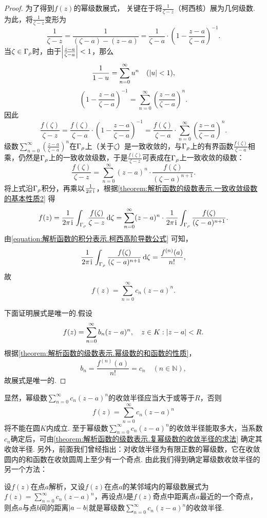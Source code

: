 \begin{theorem}
\begin{proof}
为了得到\(f(z)\)的幂级数展式，
关键在于将\(\frac{1}{\zeta-z}\)（柯西核）展为几何级数.
为此，将\(\frac{1}{\zeta-z}\)变形为\[
\frac{1}{\zeta-z}
= \frac{1}{(\zeta-a)-(z-a)}
= \frac{1}{\zeta-a} \cdot \left(1 - \frac{z-a}{\zeta-a}\right)^{-1}.
\]当\(\zeta \in \Gamma_{\rho}\)时，由于\(\abs{\frac{z-a}{\zeta-a}}<1\)，那么\[
\frac{1}{1-u} = \sum_{n=0}^\infty u^n
\quad(\abs{u}<1),
\]\[
\left(1 - \frac{z-a}{\zeta-a}\right)^{-1}
= \sum_{n=0}^\infty \left(\frac{z-a}{\zeta-a}\right)^n.
\]因此\[
\frac{f(\zeta)}{\zeta-z}
= \frac{f(\zeta)}{\zeta-a} \cdot \left(1 - \frac{z-a}{\zeta-a}\right)^{-1}
= \frac{f(\zeta)}{\zeta-a} \cdot \sum_{n=0}^\infty \left(\frac{z-a}{\zeta-a}\right)^n.
\]级数\(\sum_{n=0}^\infty \left(\frac{z-a}{\zeta-a}\right)^n\)在\(\Gamma_{\rho}\)上（关于\(\zeta\)）是一致收敛的，与\(\Gamma_{\rho}\)上的有界函数\(\frac{f(\zeta)}{\zeta-a}\)相乘，仍然是\(\Gamma_{\rho}\)上的一致收敛级数，于是\(\frac{f(\zeta)}{\zeta-z}\)可表成在\(\Gamma_{\rho}\)上一致收敛的级数：\[
\frac{f(\zeta)}{\zeta-z}
= \sum_{n=0}^\infty (z-a)^n \cdot \frac{f(\zeta)}{(\zeta-a)^{n+1}}.
\]将上式沿\(\Gamma_{\rho}\)积分，再乘以\(\frac{1}{2\pi\kern1pt\mathrm{i}\kern1pt}\)，根据\cref{theorem:解析函数的级数表示.一致收敛级数的基本性质2} 得\[
f(z) = \frac{1}{2\pi\kern1pt\mathrm{i}\kern1pt} \int_{\Gamma_{\rho}} \frac{f(\zeta)}{\zeta-z} \dd{\zeta}
= \sum_{n=0}^\infty (z-a)^n \cdot \frac{1}{2\pi\kern1pt\mathrm{i}\kern1pt} \int_{\Gamma_{\rho}} \frac{f(\zeta)}{(\zeta-a)^{n+1}}.
\]由\cref{equation:解析函数的积分表示.柯西高阶导数公式} 可知，\[
\frac{1}{2\pi\kern1pt\mathrm{i}\kern1pt} \int_{\Gamma_{\rho}} \frac{f(\zeta)}{(\zeta-a)^{n+1}} \dd{\zeta}
= \frac{f^{(n)}(a)}{n!},
\]故\[
f(z) = \sum_{n=0}^\infty c_n (z-a)^n.
\]

下面证明展式是唯一的.假设\[
f(z) = \sum_{n=0}^\infty b_n (z-a)^n,
\quad z \in K: \abs{z-a}<R.
\]根据\cref{theorem:解析函数的级数表示.幂级数的和函数的性质}，\[
b_n = \frac{f^{(n)}(a)}{n!} = c_n \quad (n\in\mathbb{N}),
\]故展式是唯一的.
\end{proof}
\end{theorem}
显然，幂级数\(\sum_{n=0}^\infty c_n (z-a)^n\)的收敛半径应当大于或等于\(R\)，否则\[
f(z) = \sum_{n=0}^\infty c_n (z-a)^n
\]将不能在圆\(K\)内成立.
至于幂级数\(\sum_{n=0}^\infty c_n (z-a)^n\)的收敛半径能取多大，当系数\(c_n\)确定后，可由\cref{theorem:解析函数的级数表示.复幂级数的收敛半径的求法} 确定其收敛半径.
另外，前面我们曾经指出：对收敛半径为有限正数的幂级数，它在收敛圆内的和函数在收敛圆周上至少有一个奇点.
由此我们得到确定幂级数收敛半径的另一个方法：

设\(f(z)\)在点\(a\)解析，又设\(f(z)\)在点\(a\)的某邻域内的幂级数展式为\(f(z) = \sum_{n=0}^\infty c_n (z-a)^n\)，再设点\(b\)是\(f(z)\)奇点中距离点\(a\)最近的一个奇点，则点\(a\)与点\(b\)间的距离\(\abs{a-b}\)就是幂级数\(\sum_{n=0}^\infty c_n (z-a)^n\)的收敛半径.

